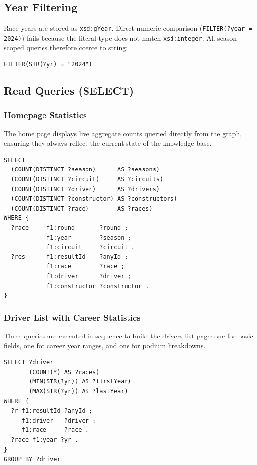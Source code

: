 \documentclass[12pt,a4paper]{article}
\begin{document}
\subsection{Year Filtering}

Race years are stored as \texttt{xsd:gYear}. Direct numeric comparison
(\texttt{FILTER(?year = 2024)}) fails because the literal type does not match
\texttt{xsd:integer}. All season-scoped queries therefore coerce to string:

\begin{lstlisting}[style=sparql]
FILTER(STR(?yr) = "2024")
\end{lstlisting}

\subsection{Read Queries (SELECT)}

\subsubsection{Homepage Statistics}

The home page displays live aggregate counts queried directly from the graph,
ensuring they always reflect the current state of the knowledge base.

\begin{lstlisting}[style=sparql, caption={Aggregate entity counts for the homepage}]
SELECT
  (COUNT(DISTINCT ?season)      AS ?seasons)
  (COUNT(DISTINCT ?circuit)     AS ?circuits)
  (COUNT(DISTINCT ?driver)      AS ?drivers)
  (COUNT(DISTINCT ?constructor) AS ?constructors)
  (COUNT(DISTINCT ?race)        AS ?races)
WHERE {
  ?race     f1:round       ?round ;
            f1:year        ?season ;
            f1:circuit     ?circuit .
  ?res      f1:resultId    ?anyId ;
            f1:race        ?race ;
            f1:driver      ?driver ;
            f1:constructor ?constructor .
}
\end{lstlisting}

\subsubsection{Driver List with Career Statistics}

Three queries are executed in sequence to build the drivers list page: one for
basic fields, one for career year ranges, and one for podium breakdowns.

\begin{lstlisting}[style=sparql, caption={Career year range per driver (MIN/MAX over race years)}]
SELECT ?driver
       (COUNT(*) AS ?races)
       (MIN(STR(?yr)) AS ?firstYear)
       (MAX(STR(?yr)) AS ?lastYear)
WHERE {
  ?r f1:resultId ?anyId ;
     f1:driver   ?driver ;
     f1:race     ?race .
  ?race f1:year ?yr .
}
GROUP BY ?driver
\end{lstlisting}
\end{document}
